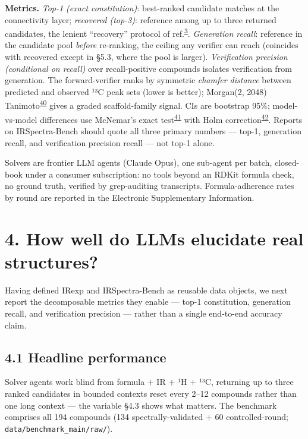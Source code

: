 \documentclass[
  10pt,
]{article}
\begin{document}
\textbf{Metrics.} \emph{Top-1 (exact constitution)}: best-ranked
candidate matches at the connectivity layer; \emph{recovered (top-3)}:
reference among up to three returned candidates, the lenient
``recovery'' protocol of
ref.\textsuperscript{\protect\hyperlink{ref-kamber2026chemist}{3}}.
\emph{Generation recall}: reference in the candidate pool \emph{before}
re-ranking, the ceiling any verifier can reach (coincides with recovered
except in §5.3, where the pool is larger). \emph{Verification precision
(conditional on recall)} over recall-positive compounds isolates
verification from generation. The forward-verifier ranks by symmetric
\emph{chamfer distance} between predicted and observed ¹³C peak sets
(lower is better); Morgan(2, 2048)
Tanimoto\textsuperscript{\protect\hyperlink{ref-rogers2010ecfp}{40}}
gives a graded scaffold-family signal. CIs are bootstrap 95\%;
model-vs-model differences use McNemar's exact
test\textsuperscript{\protect\hyperlink{ref-mcnemar1947}{41}} with Holm
correction\textsuperscript{\protect\hyperlink{ref-holm1979}{42}}.
Reports on IRSpectra-Bench should quote all three primary numbers ---
top-1, generation recall, and verification precision \textbar{} recall
--- not top-1 alone.

Solvers are frontier LLM agents (Claude Opus), one sub-agent per batch,
closed-book under a consumer subscription: no tools beyond an RDKit
formula check, no ground truth, verified by grep-auditing transcripts.
Formula-adherence rates by round are reported in the Electronic
Supplementary Information.

\hypertarget{how-well-do-llms-elucidate-real-structures}{%
\section{4. How well do LLMs elucidate real
structures?}\label{how-well-do-llms-elucidate-real-structures}}

Having defined IRexp and IRSpectra-Bench as reusable data objects, we
next report the decomposable metrics they enable --- top-1 constitution,
generation recall, and verification precision --- rather than a single
end-to-end accuracy claim.

\hypertarget{headline-performance}{%
\subsection{4.1 Headline performance}\label{headline-performance}}

Solver agents work blind from formula + IR + ¹H + ¹³C, returning up to
three ranked candidates in bounded contexts reset every 2--12 compounds
rather than one long context --- the variable §4.3 shows what matters.
The benchmark comprises all 194 compounds (134 spectrally-validated + 60
controlled-round;
\texttt{data/\hspace{0pt}benchmark\_main/\hspace{0pt}raw/}).
\end{document}
